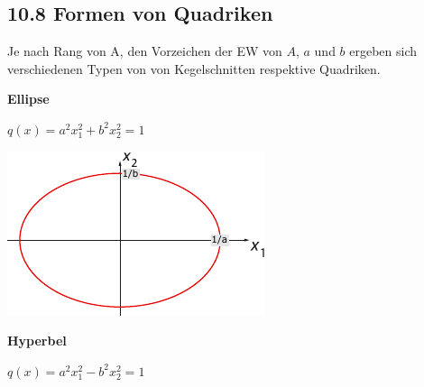 \subsection{10.8 Formen von Quadriken}{
\vskip1pt

Je nach Rang von A, den Vorzeichen der EW von $A$, $a$ und $b$ ergeben sich verschiedenen Typen von von Kegelschnitten respektive Quadriken.\par\vskip4pt

\textbf{Ellipse}\par\vskip2pt
$q(x) = a^2x_1^2 + b^2x_2^2 = 1$

\vspace{-2.5mm}
\begin{center}
\includegraphics[width=0.45\columnwidth]{10_Quadratische_Formen/ellipse.pdf}
\end{center}
\vspace{-2mm}

\textbf{Hyperbel}\par\vskip2pt
$q(x) = a^2x_1^2 - b^2x_2^2 = 1$

}
